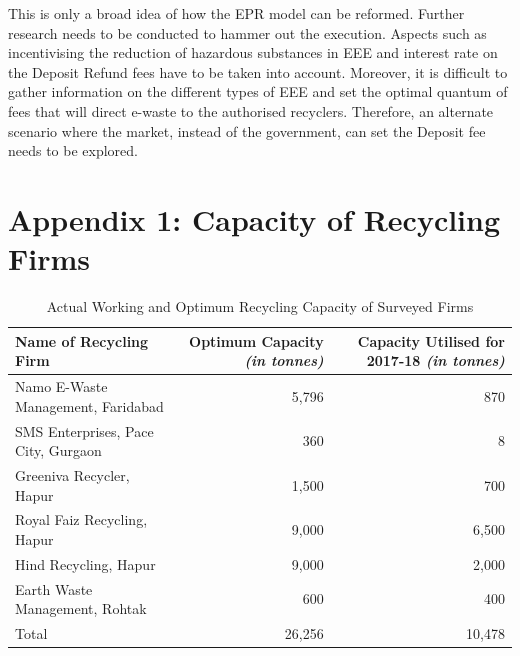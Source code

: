 \documentclass[a4paper, 12pt]{article}
\begin{document}
                    This is only a broad idea of how the EPR model can be reformed. Further research needs to be conducted to hammer out the execution. Aspects such as incentivising the reduction of hazardous substances in EEE and interest rate on the Deposit Refund fees have to be taken into account. Moreover, it is difficult to gather information on the different types of EEE and set the optimal quantum of fees that will direct e-waste to the authorised recyclers. Therefore, an alternate scenario where the market, instead of the government, can set the Deposit fee needs to be explored.
         

	\printbibliography[title={Bibliography}]
	      
        \newpage      
             \section*{Appendix 1: Capacity of Recycling Firms}
         
\begin{table}[htpb]
\raggedright
\caption{Actual Working and Optimum Recycling Capacity of Surveyed Firms}
\begin{tabular}{ l  r  r }
    \multicolumn{1}{p{7em}}{\raggedright{Name of Recycling Firm}} & \multicolumn{1}{p{8.5em}}{Optimum Capacity \raggedleft\footnotesize\textit{(in tonnes)}} & \multicolumn{1}{p{9.5em}}{Capacity Utilised for 2017-18 \raggedleft\footnotesize\textit{(in tonnes)}} \\
          \hline

Namo E-Waste Management, Faridabad & 5,796 & 870 \\
SMS Enterprises, Pace City, Gurgaon & 360 & 8 \\
Greeniva Recycler, Hapur & 1,500 & 700 \\
Royal Faiz Recycling, Hapur & 9,000 & 6,500 \\
Hind Recycling, Hapur & 9,000 & 2,000 \\
Earth Waste Management, Rohtak & 600 & 400 \\
\hline
Total & 26,256 & 10,478  \\ 
\end{tabular}
\end{table}
        
\end{document}
